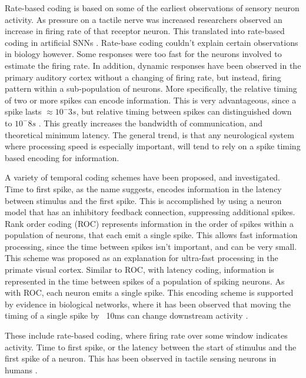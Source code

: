     Rate-based coding is based on some of the earliest observations of sensory
    neuron activity. As pressure on a tactile nerve was increased researchers
    observed an increase in firing rate of that receptor neuron. This translated
    into rate-based coding in artificial SNNs \cite{ponulak_2011}. Rate-base
    coding couldn't explain certain observations in biology however. Some
    responses were too fast for the neurons involved to estimate the firing
    rate. In addition, dynamic responses have been observed in the primary
    auditory cortex without a changing of firing rate, but instead, firing
    pattern within a sub-population of neurons. More specifically, the relative
    timing of two or more spikes can encode information. This is very
    advantageous, since a spike lasts $\approx 10^-3s$, but relative timing
    between spikes can distinguished down to $10^-8s$ \cite{ponulak_2011}. This
    greatly increases the bandwidth of communication, and theoretical minimum
    latency. The general trend, is that any neurological system where processing
    speed is especially important, will tend to rely on a spike timing based
    encoding for information.
    
    A variety of temporal coding schemes have been proposed, and
    investigated. Time to first spike, as the name suggests, encodes information
    in the latency between stimulus and the first spike. This is accomplished by
    using a neuron model that has an inhibitory feedback connection, suppressing
    additional spikes. Rank order coding (ROC) represents information in the
    order of spikes within a population of neurons, that each emit a single
    spike. This allows fast information processing, since the time between
    spikes isn't important, and can be very small. This scheme was proposed as
    an explanation for ultra-fast processing in the primate visual
    cortex. Similar to ROC, with latency coding, information is represented in
    the time between spikes of a population of spiking neurons. As with ROC,
    each neuron emits a single spike. This encoding scheme is supported by
    evidence in biological networks, where it has been observed that moving the
    timing of a  single spike by ~10ms can change downstream activity
    \cite{ponulak_2011}.
    
    These include rate-based coding, where firing rate over some window
    indicates activity. Time to first spike, or the latency between the start of
    stimulus and the first spike of a neuron. This has been observed in tactile
    sensing neurons in humans \cite{ponulak_2011}.
    
